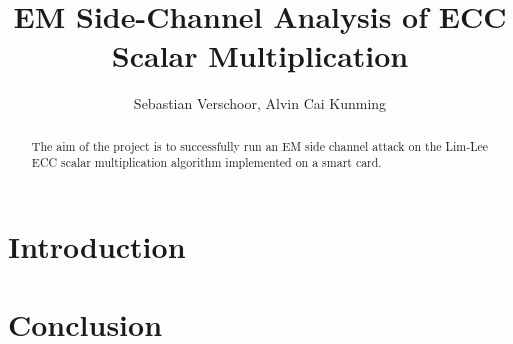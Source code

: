 \documentclass{llncs}
\begin{document}
\title{EM Side-Channel Analysis of ECC Scalar Multiplication}
\author{Sebastian Verschoor, Alvin Cai Kunming}
\maketitle
%
\begin{abstract}
The aim of the project is to successfully run an EM side channel attack on the Lim-Lee ECC scalar multiplication algorithm implemented on a smart card. 
\end{abstract}
%
\section{Introduction}

\section{Conclusion}





\begin{thebibliography}{99}



\end{thebibliography}
\end{document}
